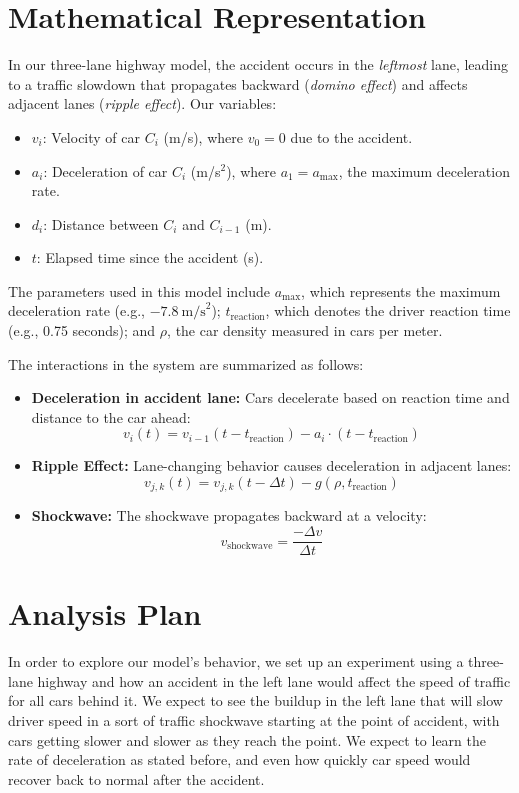 \documentclass[10pt]{article}
\begin{document}
\section*{Mathematical Representation}
In our three-lane highway model, the accident occurs in the \textit{leftmost} lane, leading to a traffic slowdown that propagates backward (\textit{domino effect}) and affects adjacent lanes (\textit{ripple effect}). Our variables:
\begin{itemize}
    \item \( v_i \): Velocity of car \( C_i \) (m/s), where \( v_0 = 0 \) due to the accident.
    \item \( a_i \): Deceleration of car \( C_i \) (m/s$^2$), where \( a_1 = a_{\text{max}} \), the maximum deceleration rate.
    \item \( d_i \): Distance between \( C_i \) and \( C_{i-1} \) (m).
    \item \( t \): Elapsed time since the accident (s).
\end{itemize}

\noindent The parameters used in this model include \(a_{\text{max}}\), which represents the maximum deceleration rate (e.g., \(-7.8 \ \text{m/s}^2\)); \(t_{\text{reaction}}\), which denotes the driver reaction time (e.g., 0.75 seconds); and \(\rho\), the car density measured in cars per meter.

The interactions in the system are summarized as follows:
\begin{itemize}
    \item \textbf{Deceleration in accident lane:} Cars decelerate based on reaction time and distance to the car ahead:
    \[
    v_i(t) = v_{i-1}(t - t_{\text{reaction}}) - a_i \cdot (t - t_{\text{reaction}})
    \]
    \item \textbf{Ripple Effect:} Lane-changing behavior causes deceleration in adjacent lanes:
    \[
    v_{j,k}(t) = v_{j,k}(t - \Delta t) - g(\rho, t_{\text{reaction}})
    \]
    \item \textbf{Shockwave:} The shockwave propagates backward at a velocity:
    \[
    v_{\text{shockwave}} = \frac{-\Delta v}{\Delta t}
    \]
\end{itemize}

\section*{Analysis Plan}
In order to explore our model’s behavior, we set up an experiment using a three-lane highway and how an accident in the left lane would affect the speed of traffic for all cars behind it. We expect to see the buildup in the left lane that will slow driver speed in a sort of traffic shockwave starting at the point of accident, with cars getting slower and slower as they reach the point. We expect to learn the rate of deceleration as stated before, and even how quickly car speed would recover back to normal after the accident.   
\end{document}
